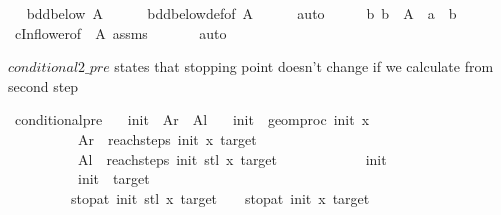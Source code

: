\begin{isabellebody}
%
\isadelimproof
%
\endisadelimproof
%
\isatagproof
{}\isamarkupfalse%
{\isacharminus}{\kern0pt}\isanewline
\ \ \isamarkupfalse%
{\isachardoublequoteopen}bdd{\isacharunderscore}{\kern0pt}below\ A{\isachardoublequoteclose}\isanewline
\ \ \ \ \isamarkupfalse%
\ bdd{\isacharunderscore}{\kern0pt}below{\isacharunderscore}{\kern0pt}def{\isacharbrackleft}{\kern0pt}of\ A{\isacharbrackright}{\kern0pt}\isanewline
\ \ \ \ \isamarkupfalse%
\ auto\isanewline
\ \ \isamarkupfalse%
\ \isamarkupfalse%
\ {\isachardoublequoteopen}{\isasymAnd}b{\isachardot}{\kern0pt}\ b\ {\isasymin}\ A\ {\isasymLongrightarrow}\ a\ {\isasymle}\ b{\isachardoublequoteclose}\isanewline
\ \ \ \ \isamarkupfalse%
\ cInf{\isacharunderscore}{\kern0pt}lower{\isacharbrackleft}{\kern0pt}of\ {\isacharunderscore}{\kern0pt}\ A{\isacharbrackright}{\kern0pt}\ assms\ \isanewline
\ \ \ \ \isamarkupfalse%
\ auto\isanewline
{}\isamarkupfalse%
%
\endisatagproof
{\isafoldproof}%
%
\isadelimproof
%
\endisadelimproof
%
\begin{isamarkuptext}%
$conditional2\_pre$ states that stopping point doesn't change if we calculate from second step%
\end{isamarkuptext}\isamarkuptrue%
\isamarkupfalse%
\ conditional{}{\isacharunderscore}{\kern0pt}pre{\isacharcolon}{\kern0pt}\isanewline
\ \ \ init{\isacharprime}{\kern0pt}\ \ Ar\ \ Al\isanewline
\ \ \ {\isachardoublequoteopen}init{\isacharprime}{\kern0pt}\ {\isacharequal}{\kern0pt}\ geom{\isacharunderscore}{\kern0pt}proc\ init\ x\ {}{\isachardoublequoteclose}\isanewline
\ \ \ \ \ \ \ \ \ \ {\isachardoublequoteopen}Ar\ {\isacharequal}{\kern0pt}\ reach{\isacharunderscore}{\kern0pt}steps\ init\ x\ target{\isachardoublequoteclose}\isanewline
\ \ \ \ \ \ \ \ \ \ {\isachardoublequoteopen}Al\ {\isacharequal}{\kern0pt}\ reach{\isacharunderscore}{\kern0pt}steps\ init{\isacharprime}{\kern0pt}\ {\isacharparenleft}{\kern0pt}stl\ x{\isacharparenright}{\kern0pt}\ target{\isachardoublequoteclose}\isanewline
\ \ \ \ \ \ \ \ \ \ {\isachardoublequoteopen}{}\ {\isacharless}{\kern0pt}\ init{\isachardoublequoteclose}\ \isanewline
\ \ \ \ \ \ \ \ \ \ {\isachardoublequoteopen}init\ {\isacharless}{\kern0pt}\ target{\isachardoublequoteclose}\isanewline
\ \ \ \ \ \ \ \ \ stop{\isacharunderscore}{\kern0pt}at\ init{\isacharprime}{\kern0pt}\ {\isacharparenleft}{\kern0pt}stl\ x{\isacharparenright}{\kern0pt}\ target\ {\isacharplus}{\kern0pt}\ {}\ {\isacharequal}{\kern0pt}\ stop{\isacharunderscore}{\kern0pt}at\ init\ x\ target{\isachardoublequoteclose}\isanewline

\end{isabellebody}
